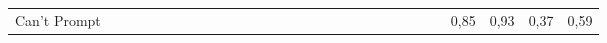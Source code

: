 \begin{tabular}{l|rrrrrrrrrrrr|rrrrrrrrrrrr|llll}
Can't Prompt                                & \multicolumn{1}{l}{}  & \multicolumn{1}{l}{}    & \multicolumn{1}{l}{}  & \multicolumn{1}{l}{}    & \multicolumn{1}{l}{}  & \multicolumn{1}{l}{}    & \multicolumn{1}{l}{}  & \multicolumn{1}{l}{}    & \multicolumn{1}{l}{}  & \multicolumn{1}{l}{}    & \multicolumn{1}{l}{}  & \multicolumn{1}{l}{}    & \multicolumn{1}{l}{}  & \multicolumn{1}{l}{}    & \multicolumn{1}{l}{}  & \multicolumn{1}{l}{}    & \multicolumn{1}{l}{}  & \multicolumn{1}{l}{}    & \multicolumn{1}{l}{}  & \multicolumn{1}{l}{}    & \multicolumn{1}{l}{}  & \multicolumn{1}{l}{}    & \multicolumn{1}{l}{}  & \multicolumn{1}{l}{}    & \multicolumn{1}{r}{0,85} & \multicolumn{1}{r}{0,93} & \multicolumn{1}{r}{0,37} & \multicolumn{1}{r}{0,59}
\end{tabular}